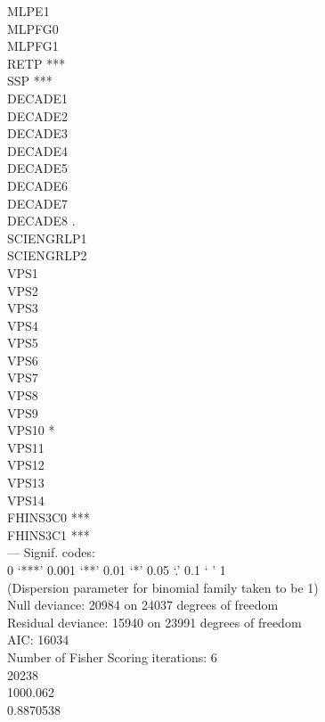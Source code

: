 \documentclass[12pt]{article}
\begin{document}
MLPE1          \\
MLPFG0         \\
MLPFG1         \\
RETP        ***\\
SSP         ***\\
DECADE1        \\
DECADE2        \\
DECADE3        \\
DECADE4        \\
DECADE5        \\
DECADE6        \\
DECADE7        \\
DECADE8     .  \\
SCIENGRLP1     \\
SCIENGRLP2     \\
VPS1           \\
VPS2           \\
VPS3           \\
VPS4           \\
VPS5           \\
VPS6           \\
VPS7           \\
VPS8           \\
VPS9           \\
VPS10       *  \\
VPS11          \\
VPS12          \\
VPS13          \\
VPS14          \\
FHINS3C0    ***\\
FHINS3C1    ***\\
---
Signif. codes:  \\
0 ‘***’ 0.001 ‘**’ 0.01 ‘*’ 0.05 ‘.’ 0.1 ‘ ’ 1\\

(Dispersion parameter for binomial family taken to be 1)\\

    Null deviance: 20984  on 24037  degrees of freedom\\
Residual deviance: 15940  on 23991  degrees of freedom\\
AIC: 16034\\

Number of Fisher Scoring iterations: 6\\

 20238\\
1000.062\\
0.8870538\\
\end{document}
